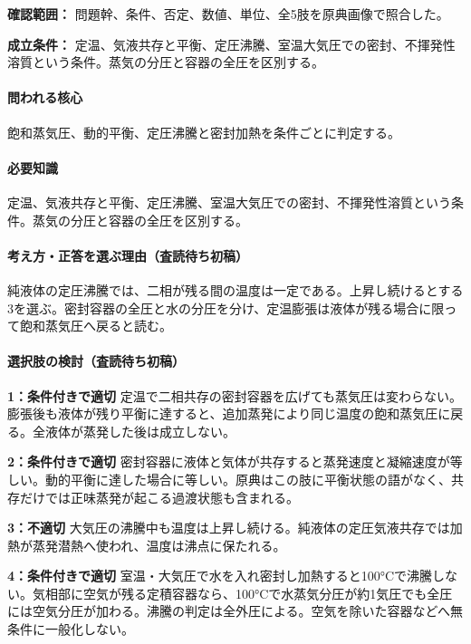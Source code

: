 \noindent\textbf{確認範囲：} 問題幹、条件、否定、数値、単位、全5肢を原典画像で照合した。\par

\noindent\textbf{成立条件：} 定温、気液共存と平衡、定圧沸騰、室温大気圧での密封、不揮発性溶質という条件。蒸気の分圧と容器の全圧を区別する。\par

\paragraph{問われる核心} 飽和蒸気圧、動的平衡、定圧沸騰と密封加熱を条件ごとに判定する。

\paragraph{必要知識} 定温、気液共存と平衡、定圧沸騰、室温大気圧での密封、不揮発性溶質という条件。蒸気の分圧と容器の全圧を区別する。

\paragraph{考え方・正答を選ぶ理由（査読待ち初稿）} 純液体の定圧沸騰では、二相が残る間の温度は一定である。上昇し続けるとする3を選ぶ。密封容器の全圧と水の分圧を分け、定温膨張は液体が残る場合に限って飽和蒸気圧へ戻ると読む。

\paragraph{選択肢の検討（査読待ち初稿）}\mbox{}\par

\noindent\textbf{1：条件付きで適切} 定温で二相共存の密封容器を広げても蒸気圧は変わらない。膨張後も液体が残り平衡に達すると、追加蒸発により同じ温度の飽和蒸気圧に戻る。全液体が蒸発した後は成立しない。\par

\noindent\textbf{2：条件付きで適切} 密封容器に液体と気体が共存すると蒸発速度と凝縮速度が等しい。動的平衡に達した場合に等しい。原典はこの肢に平衡状態の語がなく、共存だけでは正味蒸発が起こる過渡状態も含まれる。\par

\noindent\textbf{3：不適切} 大気圧の沸騰中も温度は上昇し続ける。純液体の定圧気液共存では加熱が蒸発潜熱へ使われ、温度は沸点に保たれる。\par

\noindent\textbf{4：条件付きで適切} 室温・大気圧で水を入れ密封し加熱すると100°Cで沸騰しない。気相部に空気が残る定積容器なら、100°Cで水蒸気分圧が約1気圧でも全圧には空気分圧が加わる。沸騰の判定は全外圧による。空気を除いた容器などへ無条件に一般化しない。\par


